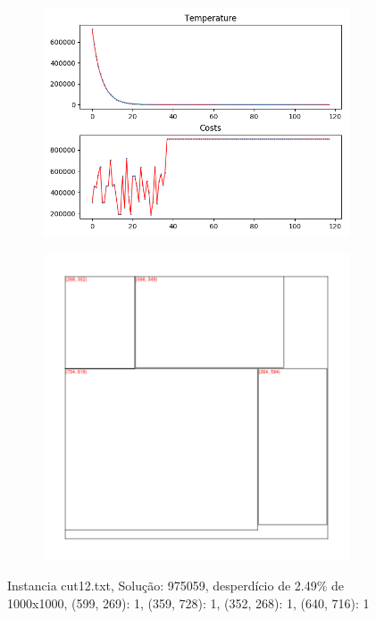 
\begin{figure}
\centering
\begin{subfigure}{.5\textwidth}
  \centering
  \includegraphics[width=1\linewidth]{results/cut12/3/plot}
  \label{fig:sub1}
\end{subfigure}%
\begin{subfigure}{.5\textwidth}
  \centering
  \includegraphics[width=1\linewidth]{results/cut12/3/cut}
  \label{fig:sub2}
\end{subfigure}
\caption{Instancia cut12.txt, Solução: 975059, desperdício de 2.49\% de 1000x1000, {(599, 269): 1, (359, 728): 1, (352, 268): 1, (640, 716): 1}}
\label{fig:test}
\end{figure}


